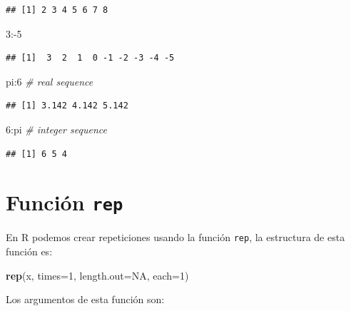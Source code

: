 \documentclass[10pt,]{krantz}
\makeatletter
\newenvironment{Shaded}{\begin{snugshade}}{\end{snugshade}}
\newcommand{\KeywordTok}[1]{\textcolor[rgb]{0.13,0.29,0.53}{\textbf{{#1}}}}
\newcommand{\DataTypeTok}[1]{\textcolor[rgb]{0.13,0.29,0.53}{{#1}}}
\newcommand{\DecValTok}[1]{\textcolor[rgb]{0.00,0.00,0.81}{{#1}}}
\newcommand{\CommentTok}[1]{\textcolor[rgb]{0.56,0.35,0.01}{\textit{{#1}}}}
\newcommand{\OtherTok}[1]{\textcolor[rgb]{0.56,0.35,0.01}{{#1}}}
\newcommand{\NormalTok}[1]{{#1}}
\let\proglang=\textsf
\newenvironment{kframe}{%
\medskip{}
\setlength{\fboxsep}{.8em}
 \def\at@end@of@kframe{}%
 \ifinner\ifhmode%
  \def\at@end@of@kframe{\end{minipage}}%
  \begin{minipage}{\columnwidth}%
 \fi\fi%
 \def\FrameCommand##1{\hskip\@totalleftmargin \hskip-\fboxsep
 \colorbox{shadecolor}{##1}\hskip-\fboxsep
     \hskip-\linewidth \hskip-\@totalleftmargin \hskip\columnwidth}%
 \MakeFramed {\advance\hsize-\width
   \@totalleftmargin\z@ \linewidth\hsize
   \@setminipage}}%
 {\par\unskip\endMakeFramed%
 \at@end@of@kframe}
\renewenvironment{Shaded}{\begin{kframe}}{\end{kframe}}
\makeatother
\begin{document}
\begin{verbatim}
## [1] 2 3 4 5 6 7 8
\end{verbatim}

\begin{Shaded}
\begin{Highlighting}[]
\DecValTok{3}\NormalTok{:-}\DecValTok{5}
\end{Highlighting}
\end{Shaded}

\begin{verbatim}
## [1]  3  2  1  0 -1 -2 -3 -4 -5
\end{verbatim}

\begin{Shaded}
\begin{Highlighting}[]
\NormalTok{pi:}\DecValTok{6}  \CommentTok{# real sequence}
\end{Highlighting}
\end{Shaded}

\begin{verbatim}
## [1] 3.142 4.142 5.142
\end{verbatim}

\begin{Shaded}
\begin{Highlighting}[]
\DecValTok{6}\NormalTok{:pi  }\CommentTok{# integer sequence}
\end{Highlighting}
\end{Shaded}

\begin{verbatim}
## [1] 6 5 4
\end{verbatim}

\section{\texorpdfstring{Función \texttt{rep} 
}{Función rep  }}\label{funcion-rep}

En \proglang{R} podemos crear repeticiones usando la función
\texttt{rep}, la estructura de esta función es:

\begin{Shaded}
\begin{Highlighting}[]
\KeywordTok{rep}\NormalTok{(x, }\DataTypeTok{times=}\DecValTok{1}\NormalTok{, }\DataTypeTok{length.out=}\OtherTok{NA}\NormalTok{, }\DataTypeTok{each=}\DecValTok{1}\NormalTok{)}
\end{Highlighting}
\end{Shaded}

Los argumentos de esta función son:
\end{document}
